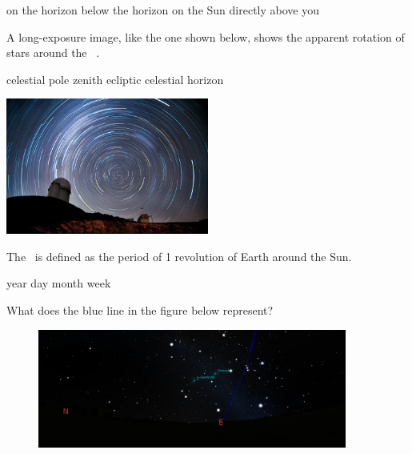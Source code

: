 \documentclass[addpoints]{exam}
\begin{document}
\begin{questions}
\begin{choices}
\choice on the horizon
\choice below the horizon
\choice on the Sun
\correctchoice directly above you
\end{choices}

\question
A long-exposure image, like the one shown below, shows the apparent rotation of stars around the \fillin\ .

\begin{minipage}{0.3\textwidth}
    \centering
    \begin{choices}
    \correctchoice celestial pole
    \choice zenith
    \choice ecliptic
    \choice celestial horizon
    \end{choices}
\end{minipage}%
\begin{minipage}{0.5\textwidth}
    \centering
    \includegraphics[width=0.5\textwidth]{Figures/Figure2.4.jpg}
\end{minipage}
\vspace{1em}


\question
The \fillin\ is defined as the period of 1 revolution of Earth around the Sun.

\begin{choices}
\correctchoice year
\choice day
\choice month
\choice week
\end{choices}

\question
What does the blue line in the figure below represent?

\begin{figure}[h!]
    \centering
    \includegraphics[width=4in]{Figures/Ch2_Fig_CelestialEquator.png}
\end{figure}


\end{questions}
\end{document}
